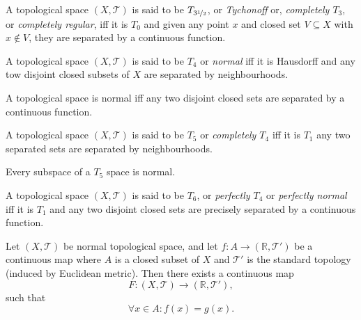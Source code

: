 \begin{definition}
	\label{def: T_3.5 spaces}
	A topological space $(X, \mathcal T)$ is said to be $T_{3 \nicefrac{1}{2}}$, or \textit{Tychonoff} or, \textit{completely $T_3$}, or \textit{completely regular}, iff it is $T_0$ and given any point $x$ and closed set $V \subseteq X$ with $x \notin V$, they are separated by a continuous function.
\end{definition}


\begin{definition}
	[$T_4$ spaces]
	\label{def: T_4 spaces}
	A topological space $(X, \mathcal T)$ is said to be $T_4$ or \textit{normal} iff it is Hausdorff and any tow disjoint closed subsets of $X$ are separated by neighbourhoods.
\end{definition}


\begin{proposition}
	\label{prop: urysohn's lemma}
	A topological space is normal iff any two disjoint closed sets are separated by a continuous function.
\end{proposition}


\begin{definition}
	[$T_5$ spaces]
	\label{def: T_5 spaces}
	A topological space $(X, \mathcal T)$ is said to be $T_5$ or \textit{completely $T_4$} iff it is $T_1$ any two separated sets are separated by neighbourhoods.
\end{definition}


\begin{proposition}
	Every subspace of a $T_5$ space is normal.
\end{proposition}


\begin{definition}
	[$T_6$ spaces]
	\label{def: T_6 spaces}
	A topological space $(X, \mathcal T)$ is said to be $T_6$, or \textit{perfectly $T_4$} or \textit{perfectly normal} iff it is $T_1$ and any two disjoint closed sets are precisely separated by a continuous function.
\end{definition}



\begin{proposition}
	\label{prop: Tietze extension theorem}
	Let $(X, \mathcal T)$ be normal topological space, and let $f: A \to (\mathbb R, \mathcal T')$ be a continuous map where $A$ is a closed subset of $X$ and $\mathcal T'$ is the standard topology (induced by Euclidean metric). Then there exists a continuous map
	$$
	F: (X, \mathcal T) \to (\mathbb R, \mathcal T'),
	$$
	such that
	$$
	\forall x \in A: f(x) = g(x).
	$$
\end{proposition}
